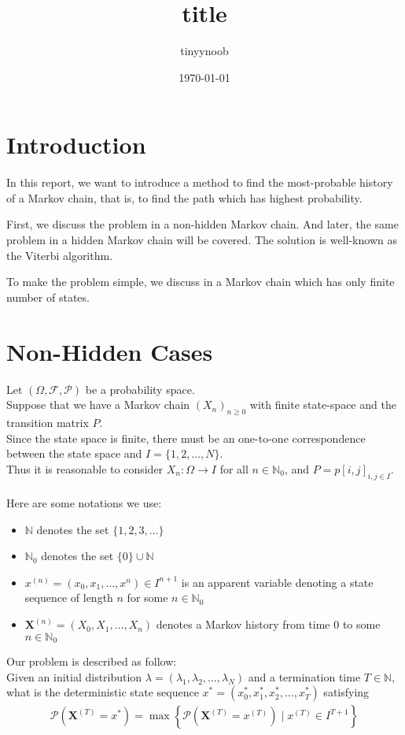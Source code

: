 \documentclass{article}
\title{title}
\author{tinyynoob}
\date{\today}
\begin{document}
\section{Introduction}

In this report, we want to introduce a method to find the most-probable history of a Markov chain, 
that is, to find the path which has highest probability.

First, we discuss the problem in a non-hidden Markov chain. 
And later, the same problem in a hidden Markov chain will be covered. 
The solution is well-known as the Viterbi algorithm.

To make the problem simple, we discuss in a Markov chain which has only finite number of states.


\section{Non-Hidden Cases} \setlength{\parindent}{0cm}

Let $(\Omega,\mathcal{F},\mathcal{P})$ be a probability space. \\
Suppose that we have a Markov chain $(X_n)_{n\geq 0}$ with finite state-space and the transition matrix $P$. \\
Since the state space is finite, there must be an one-to-one correspondence between the state space and $I=\{1,2,\dotsc,N\}$. \\
Thus it is reasonable to consider $X_n:\Omega\to I$ for all $n\in\mathbb{N}_0$, and $P=p[i,j]_{i,j\in I}$. \\
\\
Here are some notations we use:
\begin{itemize}
    \item $\mathbb{N}$ denotes the set $\{1,2,3,\dotsc\}$
    \item $\mathbb{N}_0$ denotes the set $\{0\}\cup\mathbb{N}$
    \item $x^{(n)}=(x_0,x_1,\dotsc,x^{n})\in I^{n+1}$ is an apparent variable denoting a state sequence of length $n$ for some $n\in\mathbb{N}_0$
    \item $\mathbf{X}^{(n)}=(X_0,X_1,\dotsc,X_n)$ denotes a Markov history from time $0$ to some $n\in\mathbb{N}_0$
\end{itemize}
$ $\\
Our problem is described as follow: \\
Given an initial distribution $\lambda=(\lambda_1,\lambda_2,\dotsc,\lambda_N)$ and a termination time $T\in\mathbb{N}$, 
what is the deterministic state sequence $x^*=(x^*_0,x^*_1,x^*_2,\dotsc,x^*_T)$ satisfying
\begin{align}\label{eq:1}
    \mathcal{P}(\mathbf{X}^{(T)}=x^*) = \max \left\{\mathcal{P}(\mathbf{X}^{(T)}=x^{(T)})\mid x^{(T)}\in I^{T+1}\right\}
\end{align}
\end{document}
